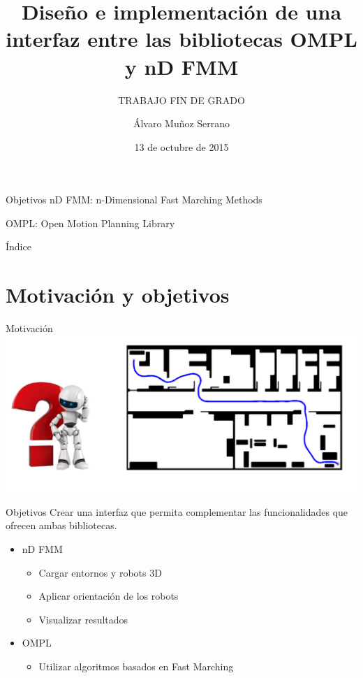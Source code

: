\documentclass[10pt]{beamer}
\title{Diseño e implementación de una interfaz entre las bibliotecas OMPL y nD FMM \vspace{0.5cm}}
\subtitle{TRABAJO FIN DE GRADO}  %
\date{13 de octubre de 2015}
\author{
Álvaro Muñoz Serrano
}
\institute[
] %
{%
 Departamento de Sistemas y Automática
  
}
\begin{document}
{%
\begin{frame} %
  \titlepage
\end{frame}}

\begin{frame}{Objetivos}
	\large nD FMM: n-Dimensional Fast Marching Methods
	\vspace{1cm}
	
	\large OMPL: Open Motion Planning Library
\end{frame}

\begin{frame}{Índice}{}
\tableofcontents
\end{frame}

\section{Motivación y objetivos}

\begin{frame}{Motivación}		\includegraphics[width=\textwidth,height=0.8\textheight,keepaspectratio]{dudabot}
\end{frame}

\begin{frame}{Objetivos}
Crear una interfaz que permita complementar las funcionalidades que ofrecen ambas bibliotecas.
\vspace{0.3cm}
\begin{itemize}
	\item nD FMM
		\begin{itemize}
			\item Cargar entornos y robots 3D
			\item Aplicar orientación de los robots
			\item Visualizar resultados
		\end{itemize}
		\vspace{0.3cm}
	\item OMPL
		\begin{itemize}
			\item Utilizar algoritmos basados en Fast Marching
		\end{itemize}
\end{itemize}
\end{frame}
\end{document}
